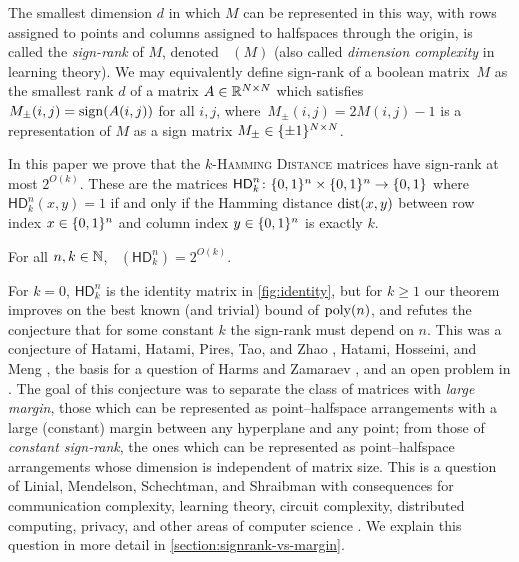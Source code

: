 \documentclass[conference]{IEEEtran}
\DeclareMathOperator{\signrank}{rank_\pm}
\newcommand{\HD}[1]{\mathsf{HD}_{#1}}
\begin{document}
The smallest dimension $d$ in which $M$ can be
represented in this way, with rows assigned to points and columns assigned to
halfspaces through the origin, is called the \emph{sign-rank} of $M$, denoted
$\signrank(M)$ (also called \emph{dimension complexity} in learning theory). We
may equivalently define sign-rank of a boolean matrix~$M$ as the smallest rank
$d$ of a matrix $A \in \mathbb{R}^{N \times N}$ which satisfies $M_\pm(i,j) =
\operatorname{sign}(A(i,j))$ for all $i,j$, where~$M_\pm(i,j) = 2M(i,j) - 1$ is a
representation of $M$ as a sign matrix $M_\pm \in \{\pm 1\}^{N \times N}$.

In this paper we prove that the
\textsc{$k$-Hamming Distance} matrices have sign-rank at most $2^{O(k)}$. These
are the matrices $\HD{k}^n\colon \zo^n \times \zo^n \to \zo$ where
$\HD{k}^n(x,y) = 1$ if and only if the Hamming distance $\operatorname{dist}(x,y)$
between row index $x \in \{0,1\}^n$ and column index $y \in \{0,1\}^n$ is exactly $k$.
\begin{theorem}
\label{thm:main}
    For all $n,k\in\mathbb{N}$, $\signrank(\HD{k}^n) = 2^{O(k)}$.
\end{theorem}
For $k=0$, $\HD{k}^n$ is the identity matrix in \cref{fig:identity}, but for $k
\geq 1$ our theorem improves on the best known (and trivial) bound of $\operatorname{poly}(n)$,
and refutes the conjecture that for some constant $k$ the sign-rank must depend
on $n$. This was a conjecture of Hatami, Hatami, Pires, Tao, and Zhao
\cite{HHPTZ22}, Hatami, Hosseini, and Meng \cite{HHM23}, the basis for a question
of Harms and Zamaraev \cite{HZ24}, and an open problem in
\cite{FHHH24,HH24,HR24,FGHH25}. The goal of this conjecture was to separate the
class of matrices with \emph{large margin}, \ie those which can be represented
as point--halfspace arrangements with a large (constant) margin between any
hyperplane and any point; from those of \emph{constant sign-rank}, \ie the ones
which can be represented as point--halfspace arrangements whose dimension is
independent of matrix size. This is a question of Linial, Mendelson, Schechtman,
and Shraibman \cite{LMSS07} with consequences for communication complexity,
learning theory, circuit complexity, distributed computing, privacy, and other
areas of computer science \cite{FKL+01, BES02, For02, LS09, FX14, BNS19, HWZ22,
HHPTZ22, HZ24, AN25}. We explain this question in more detail in
\cref{section:signrank-vs-margin}.
\end{document}
